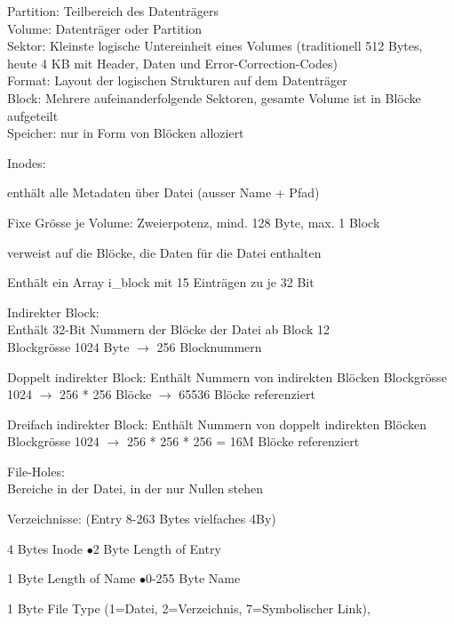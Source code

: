 \begin{multicols*}{5}
\textcolor{h}{Partition:} Teilbereich des Datenträgers\\
\textcolor{h}{Volume:} Datenträger oder Partition\\
\textcolor{h}{Sektor:} Kleinste logische Untereinheit eines Volumes (traditionell 512 Bytes, heute 4 KB mit Header, Daten und Error-Correction-Codes)\\
\textcolor{h}{Format:} Layout der logischen Strukturen auf dem Datenträger\\
\textcolor{h}{Block:} Mehrere aufeinanderfolgende Sektoren, gesamte Volume ist in Blöcke aufgeteilt\\
\textcolor{h}{Speicher:} nur in Form von Blöcken alloziert

\textcolor{h}{Inodes}: 
\begin{compactitem}[$\bullet$]
	\item enthält alle Metadaten über Datei (ausser Name + Pfad)
	\item Fixe Grösse je Volume: Zweierpotenz, mind. 128 Byte, max. 1 Block
	\item verweist auf die Blöcke, die Daten für die Datei enthalten
	\item Enthält ein Array i\_block mit 15 Einträgen zu je 32 Bit
\end{compactitem}

\textcolor{h}{Indirekter Block}: \\
Enthält 32-Bit Nummern der Blöcke der Datei ab Block 12\\
Blockgrösse 1024 Byte $\rightarrow$ 256 Blocknummern

\textcolor{h}{Doppelt indirekter Block}:
Enthält Nummern von indirekten Blöcken 
Blockgrösse 1024 $\rightarrow$ 256 * 256 Blöcke $\rightarrow$ 65536 Blöcke referenziert

\textcolor{h}{Dreifach indirekter Block}:
Enthält Nummern von doppelt indirekten Blöcken 
Blockgrösse 1024 $\rightarrow$ 256 * 256 * 256 = 16M Blöcke referenziert


\textcolor{h}{File-Holes:}\\
Bereiche in der Datei, in der nur Nullen stehen


\textcolor{h}{Verzeichnisse:} (Entry 8-263 Bytes vielfaches 4By)
\begin{compactitem}[$\bullet$]
	\item 4 Bytes Inode $\bullet$2 Byte Length of Entry
	\item 1 Byte Length of Name $\bullet$0-255 Byte Name
	\item 1 Byte File Type (1=Datei, 2=Verzeichnis, 7=Symbolischer Link), 
\end{compactitem}


\end{multicols*}
